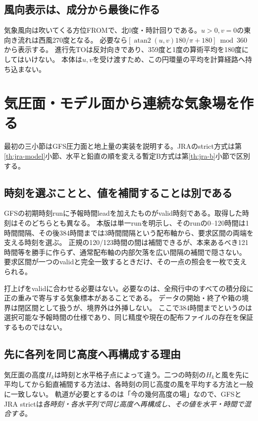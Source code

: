 \documentclass[11pt,a4paper]{article}
\begin{document}
\subsection{風向表示は、成分から最後に作る}
気象風向は吹いてくる方位FROMで、北0度・時計回りである。$u>0,v=0$の東向き流れは西風270度となる。
必要なら$[\operatorname{atan2}(u,v)180/\pi+180]\bmod360$から表示する。
進行先TOは反対向きであり、359度と1度の算術平均を180度にしてはいけない。
本体は$u,v$を受け渡すため、この円環量の平均を計算経路へ持ち込まない。

\section{気圧面・モデル面から連続な気象場を作る}\label{th:weather}\label{THEORY-WEATHER}
最初の三小節はGFS圧力面と地上量の実装を説明する。JRAのstrict方式は第\ref{th:jra-model}小節、水平と鉛直の順を変える暫定B方式は第\ref{th:jra-b}小節で区別する。
\subsection{時刻を選ぶことと、値を補間することは別である}
GFSの初期時刻runに予報時間leadを加えたものがvalid時刻である。取得した時刻はそのどちらとも異なる。
本版は単一runを明示し、そのrunの0--120時間は1時間間隔、その後384時間までは3時間間隔という配布軸から、要求区間の両端を支える時刻を選ぶ。
正規の120/123時間の間は補間できるが、本来あるべき121時間等を勝手に作らず、通常配布軸の内部欠落を広い間隔の補間で隠さない。
要求区間が一つのvalidと完全一致するときだけ、その一点の照会を一枚で支えられる。

打上げをvalidに合わせる必要はない。必要なのは、全飛行中のすべての積分段に正の重みで寄与する気象標本があることである。
データの開始・終了や箱の境界は閉区間として扱うが、境界外は外挿しない。
ここで384時間までというのは選択可能な予報時間の仕様であり、同じ精度や現在の配布ファイルの存在を保証するものではない。

\subsection{先に各列を同じ高度へ再構成する理由}
気圧面の高度$H_k$は時刻と水平格子点によって違う。二つの時刻の$H_k$と風を先に平均してから鉛直補間する方法は、各時刻の同じ高度の風を平均する方法と一般に一致しない。
軌道が必要とするのは「今の幾何高度の場」なので、GFSとJRA strictは\emph{各時刻・各水平列で同じ高度へ再構成し、その値を水平・時間で混合する}。
\end{document}
